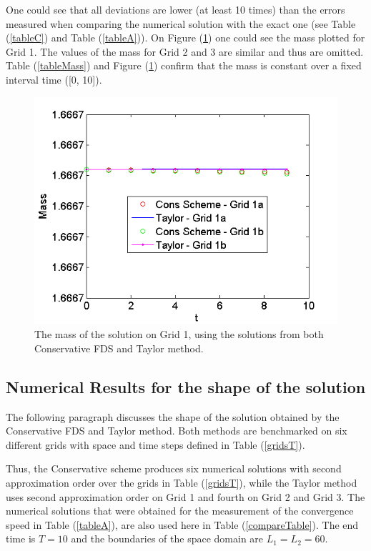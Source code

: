 \documentclass[%
 aip,
cp,  
 amsmath,amssymb,
 reprint,
]{iopconfser}
\newcommand{\rf}[1]{(\ref{#1})}
\begin{document}
One could see that all deviations are lower (at least 10 times) than the errors measured when comparing the numerical solution with the exact one (see Table \rf{tableC} and Table \rf{tableA}). On Figure \rf{massFig} one could see the mass plotted for Grid 1. The values of the mass for Grid 2 and 3 are similar and thus are omitted. Table \rf{tableMass} and Figure \rf{massFig} confirm that the mass is constant over a fixed interval time ([0, 10]).

\begin{figure}[ht]\vspace{0.2cm}
  \centering
  \includegraphics[width=0.5\linewidth]{mass.png}
\caption{The mass of the solution on Grid 1, using the solutions from both Conservative FDS and Taylor method.}
\label{massFig}
\end{figure}

\subsection{Numerical Results for the shape of the solution}

The following paragraph discusses the shape of the solution obtained by the Conservative FDS and Taylor method. Both methods are benchmarked on six different grids with space and time steps defined in Table \rf{gridsT}.

Thus, the Conservative scheme produces six numerical solutions with second approximation order over the grids in Table \rf{gridsT}, while the Taylor method uses second approximation order on Grid 1 and fourth on Grid 2 and Grid 3. The numerical solutions that were obtained for the measurement of the convergence speed in Table \rf{tableA}, are also used here in Table \rf{compareTable}. The end time is $T=10$ and the boundaries of the space domain are $L_1 = L_2 = 60$.
\end{document}
